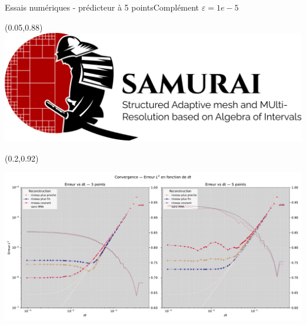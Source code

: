 \begin{frame}{Essais numériques - prédicteur à 5 points}{Complément}
    $\varepsilon = 1e-5$
    \begin{textblock*}{40pt}(0.05\paperwidth,0.88\paperheight)\includegraphics[scale=.03]{medias/2_/1_/light_logo.png}
    \end{textblock*}
    \begin{textblock*}{40pt}(0.2\paperwidth,0.92\paperheight)
        {\color{black}{+ Ponio}}
    \end{textblock*}
    \includegraphics[width = \textwidth]{medias/3_/error_vs_dt_by_mlf.pdf}
\end{frame}